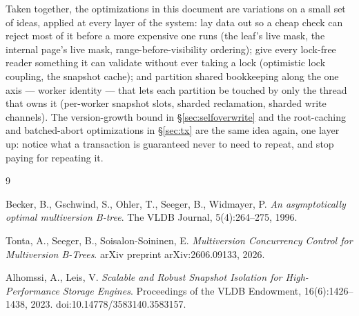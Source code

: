 \documentclass[11pt]{article}
\begin{document}
Taken together, the optimizations in this document are variations on a small set of
ideas, applied at every layer of the system: lay data out so a cheap check can reject
most of it before a more expensive one runs (the leaf's live mask, the internal
page's live mask, range-before-visibility ordering); give every lock-free reader
something it can validate without ever taking a lock (optimistic lock coupling, the
snapshot cache); and partition shared bookkeeping along the one axis --- worker
identity --- that lets each partition be touched by only the thread that owns it
(per-worker snapshot slots, sharded reclamation, sharded write channels). The
version-growth bound in \S\ref{sec:selfoverwrite} and the root-caching and
batched-abort optimizations in \S\ref{sec:tx} are the same idea again, one layer up:
notice what a transaction is guaranteed never to need to repeat, and stop paying for
repeating it.

\begin{thebibliography}{9}

Becker, B., Gschwind, S., Ohler, T., Seeger, B., Widmayer, P.
\emph{An asymptotically optimal multiversion B-tree}.
The VLDB Journal, 5(4):264--275, 1996.

Tonta, A., Seeger, B., Soisalon-Soininen, E.
\emph{Multiversion Concurrency Control for Multiversion B-Trees}.
arXiv preprint arXiv:2606.09133, 2026.

Alhomssi, A., Leis, V.
\emph{Scalable and Robust Snapshot Isolation for High-Performance Storage Engines}.
Proceedings of the VLDB Endowment, 16(6):1426--1438, 2023.
doi:10.14778/3583140.3583157.

\end{thebibliography}
\end{document}

